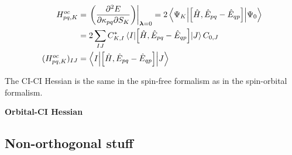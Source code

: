 \documentclass[11pt,a4paper]{article}
\newcommand{\hH}{\Hat{H}} %
\newcommand{\hE}{\Hat{E}} %
\newcommand{\com}[2]{\mleft[#1,#2 \mright]}
\begin{document}
\begin{align}
  \label{eq:MCSCF_O_CIOrb_Hessian}
  H^{oc}_{pq,K} &= \evalat*{\mleft(\pdv{E}{\kappa_{pq}}{S_{K}}\mright)}{\bm{\lambda}=0} = 2\mel**{\Psi_K}{\com{\hH}{\hE_{pq} - \hE_{qp}}}{\Psi_0} \\
                &= 2\sum_{IJ}C_{K,I}^*\mel{I}{\com{\hH}{\hE_{pq} - \hE_{qp}}}{J}C_{0,J} \notag \\
  (H^{oc}_{pq,K})_{IJ} &= \mel**{I}{\com{\hH}{\hE_{pq} - \hE_{qp}}}{J}
\end{align}

The CI-CI Hessian is the same in the spin-free formalism as in the spin-orbital formalism.

\noindent\textbf{Orbital-CI Hessian}


\subsection{Non-orthogonal stuff}
\end{document}
